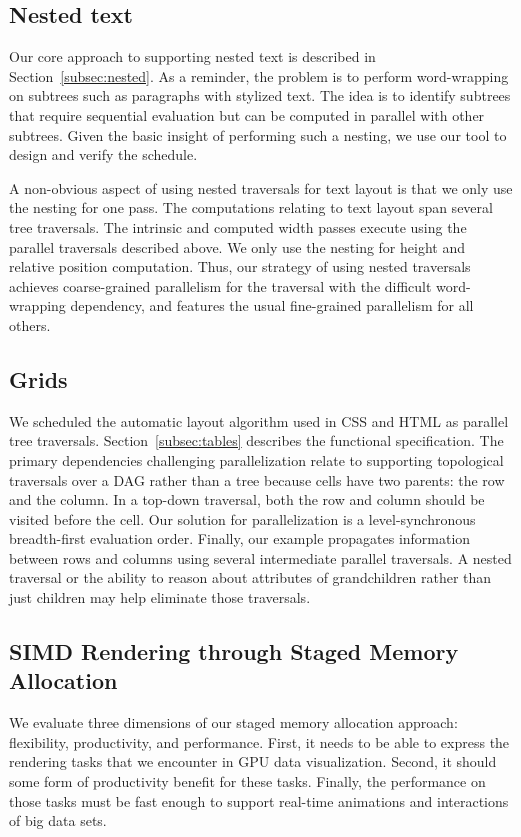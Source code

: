 \subsection{Nested text}
Our core approach to supporting nested text is described in Section~\ref{subsec:nested}. As a reminder, the problem is to perform word-wrapping on subtrees such as paragraphs with stylized text. The idea is to identify subtrees that require sequential evaluation but can be computed in parallel with other subtrees. Given the basic insight of performing such a nesting, we use our tool to design and verify the schedule.

A non-obvious aspect of using nested traversals for text layout  is that we only use the nesting for one pass. The computations relating to text layout span several tree traversals. The intrinsic and computed width passes execute using the parallel traversals described above. We only use the nesting for height and relative position computation. Thus, our strategy of using nested traversals achieves coarse-grained parallelism for the traversal with the difficult word-wrapping dependency, and features the usual fine-grained parallelism for all others.


\subsection{Grids}
We scheduled the automatic layout algorithm used in CSS and HTML as parallel tree traversals.
Section~\ref{subsec:tables} describes the functional specification. The primary dependencies challenging parallelization relate to supporting topological traversals over a DAG rather than a tree because cells have two parents: the row and the column. In a top-down traversal, both the row and column should be visited before the cell. Our solution for parallelization is a level-synchronous breadth-first evaluation order. Finally, our example propagates information between rows and columns using several intermediate parallel traversals. A nested traversal or the ability to reason about attributes of grandchildren rather than just children may help eliminate those traversals.


\subsection{SIMD Rendering through Staged Memory Allocation}
We evaluate three dimensions of our staged memory allocation approach: flexibility, productivity, and performance. First, it needs to be able to express the rendering tasks that we encounter in GPU data visualization. Second, it should some form of productivity benefit for these tasks. Finally, the performance on those tasks must be fast  enough to support real-time animations and interactions of big data sets.




